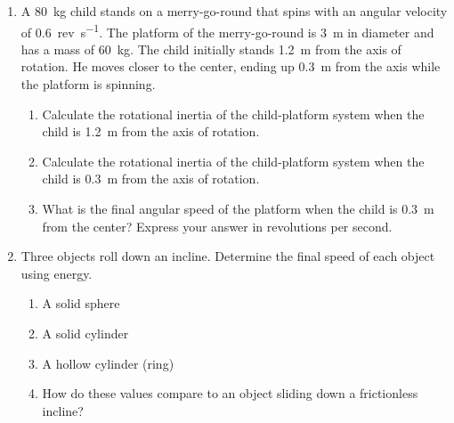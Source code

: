 \begin{enumerate}

	\item A \SI{80}{\kilogram} child stands on a merry-go-round that spins with an angular velocity of \SI{0.6}{rev\per\second}. The platform of the merry-go-round is \SI{3}{\meter} in diameter and has a mass of \SI{60}{\kilogram}. The child initially stands \SI{1.2}{\meter} from the axis of rotation. He moves closer to the center, ending up \SI{0.3}{\meter} from the axis while the platform is spinning.
	
		\begin{enumerate}
			\setlength\itemsep{2 in}
			\item Calculate the rotational inertia of the child-platform system when the child is \SI{1.2}{\meter} from the axis of rotation.
			
			\item Calculate the rotational inertia of the child-platform system when the child is \SI{0.3}{\meter} from the axis of rotation.
			
			\item What is the final angular speed of the platform when the child is \SI{0.3}{\meter} from the center? Express your answer in revolutions per second.
		\end{enumerate}
	
	\item Three objects roll down an incline. Determine the final speed of each object using energy.
	
		\begin{enumerate}
			\setlength\itemsep{2 in}
			\item A solid sphere
			
			\item A solid cylinder
			
			\item A hollow cylinder (ring)
			
			\item How do these values compare to an object sliding down a frictionless incline?
		\end{enumerate}
	
\end{enumerate}